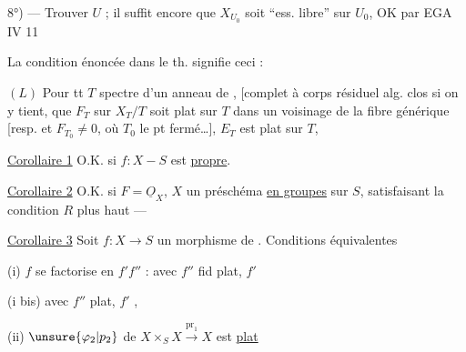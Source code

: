 8°) --- Trouver $U$ ; il suffit encore que $X_{U_0}$ soit ``ess. libre'' sur $U_0$, OK par EGA IV 11

La condition énoncée dans le th. signifie ceci :

$(L)$ Pour tt $T$ spectre d'un anneau de  , [complet à corps résiduel alg. clos si on y tient,   que $F_T$ sur $X_T/T$ soit plat sur $T$ dans un voisinage de la fibre générique [resp. et $F_{T_0}\ne0$, où $T_0$ le pt fermé\ldots],  $E_T$ est plat sur $T$, 

\uline{Corollaire 1} O.K. si $f:X-S$ est \uline{propre}.

\uline{Corollaire 2} O.K. si  $F=\underline{O}_X$, $X$ un préschéma \uline{en groupes} sur $S$, satisfaisant la condition $R$ plus haut ---

\uline{Corollaire 3} Soit $f:X\longrightarrow S$ un morphisme de  . Conditions équivalentes

(i) $f$ se factorise en $f'f''$ :  avec $f''$ fid plat, $f'$ 

(i bis)  avec $f''$ plat, $f'$ ,

(ii) $\unsure{\varphi_2|p_2}$ de $X\times_S X\xrightarrow{\mathrm{pr}_1}X$ est \uline{plat}

